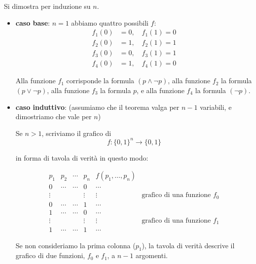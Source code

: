 \documentclass[a4paper,11pt]{report}
\begin{document}
\begin{proofbox}[title=dimostrazione]           
    Si dimostra per induzione su \( n \).

    \begin{itemize}
        \item \textbf{caso base}: \( n=1 \)
            abbiamo quattro possibili \( f \): 
            \[
                \begin{aligned}
                    f_1(0) &= 0, \quad f_1(1) = 0 \\
                    f_2(0) &= 1, \quad f_2(1) = 1 \\
                    f_3(0) &= 0, \quad f_3(1) = 1 \\
                    f_4(0) &= 1, \quad f_4(1) = 0
                \end{aligned}
            \]

            Alla funzione $f_1$ corrisponde la formula $(p \land \neg p)$, alla funzione $f_2$ la formula $(p \lor \neg p)$, 
            alla funzione $f_3$ la formula $p$, e alla funzione $f_4$ la formula $(\neg p)$.
        \item \textbf{caso induttivo}: (assumiamo che il teorema valga per \( n-1 \) variabili, e dimostriamo che vale per \( n \))

            Se $n > 1$, scriviamo il grafico di 
            \[
                f : \{0,1\}^n \to \{0,1\}
            \]

            in forma di tavola di verità in questo modo:

            \[
                \begin{array}{cccc|c|l}
                    p_1 & p_2 & \cdots & p_n & f(p_1, \ldots, p_n) & \\ \hline
                    0 & \cdots & \cdots & 0 & \cdots &  \\
                    \vdots & & & \vdots & \vdots & \text{grafico di una funzione } f_0\\
                    0 & \cdots & \cdots & 1 & \cdots & \\ \hline
                    1 & \cdots & \cdots & 0 & \cdots &  \\
                    \vdots & & & \vdots & \vdots & \text{grafico di una funzione } f_1\\
                    1 & \cdots & \cdots & 1 & \cdots & 
                \end{array}
            \]

            Se non consideriamo la prima colonna (\( p_1 \)), la tavola di verità descrive il grafico di due funzioni, \( f_0 \) e \( f_1 \), a \( n-1 \) argomenti.


\end{itemize}
\end{proofbox}
\end{document}
